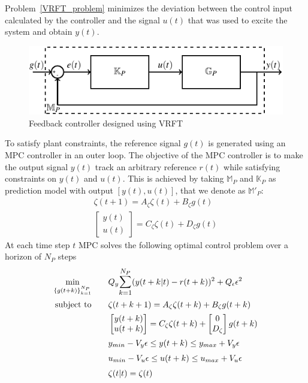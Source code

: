 \documentclass[letterpaper, 10 pt, conference]{ieeeconf}  %
\begin{document}
Problem~\eqref{VRFT_problem} minimizes the deviation between the control input calculated by the controller and the signal $u(t)$ that was used to excite the system and obtain $y(t)$.
\begin{figure}[t]
		\hspace{30pt}
	\includegraphics[scale=0.8]{KpGp.pdf}
	\caption{Feedback controller designed using VRFT}
\end{figure}
To satisfy plant constraints, the reference signal $g(t)$ is generated using an MPC controller in an outer loop. The objective of the MPC controller is to make the output signal $y(t)$ track an arbitrary reference $r(t)$ while satisfying constraints on $y(t)$ and $u(t)$. This is achieved by taking $\mathbb{M}_P$ and $\mathbb{K}_P$ as prediction model with 
output $[y(t),u(t)]$, that we denote as $\mathbb{M}'_P$:
	\begin{equation*}
	\begin{matrix}
	\zeta(t+1) = A_\zeta\zeta(t) + B_\zeta g(t)\\
	\begin{bmatrix}y(t)\\u(t)\end{bmatrix} = C_\zeta\zeta(t) + D_\zeta g(t)
	\end{matrix}
    \label{eq:cl-model}
	\end{equation*}
At each time step $t$ MPC solves the following optimal control problem over a horizon of $N_P$ steps
	\begin{equation}
	\small
	\begin{aligned}
	 \underset{\{g(t+k)\}_{k=1}^{N_P}}{\text{min}}
	& \hspace{20pt} Q_y\mathlarger{\sum\limits_{k=1}^{N_P}}(y(t+k|t)-r(t+k))^2 + Q_{\epsilon}\epsilon^2 \\
	 \text{subject to}
	&   \hspace{20pt}
	\zeta(t+k+1) = A_\zeta\zeta(t+k) + B_\zeta g(t+k)\\
	& \hspace{20pt} \begin{bmatrix}y(t+k)\\u(t+k)\end{bmatrix} = C_\zeta\zeta(t+k) +  \begin{bmatrix}0\\D_\zeta\end{bmatrix}g(t+k)\\
	& \hspace{20pt}  y_{min}-V_y\epsilon \leq y(t+k) \leq  y_{max}+V_y\epsilon \\
	& \hspace{20pt}  u_{min}-V_u\epsilon \leq u(t+k) \leq u_{max}+V_u\epsilon \\
	& \hspace{20pt}  \zeta(t|t) = \zeta(t)
	\end{aligned}
	\label{MPC}
	\end{equation}
\end{document}
